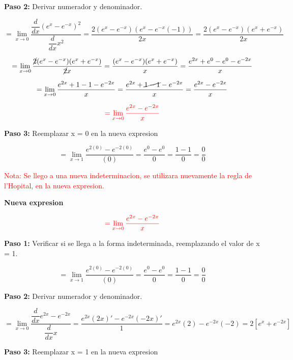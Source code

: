\documentclass[12pt,a4paper]{article}
\begin{document}
\textbf{Paso 2:}
\vspace{0.2cm}
Derivar numerador y denominador.

\[
= \lim_{x \to 0} \frac{\dfrac{d}{dx} (e^{x}- e^{-x})^2}{\dfrac{d}{dx} x^2}= \frac{2(e^{x}- e^{-x})(e^{x}- e^{-x}(-1))}{2x}= \frac{2(e^{x}- e^{-x})(e^{x}+ e^{-x})}{2x}
\]

\[
= \lim_{x \to 0} \frac{\cancel{2}(e^{x}- e^{-x})(e^{x}+ e^{-x})}{\cancel{2}x}= \frac{(e^{x}- e^{-x})(e^{x}+ e^{-x})}{x} = \frac{e^{2x}+ e^{0}-e^{0}-e^{-2x}}{x}
\]

\[
= \lim_{x \to 0} \frac{e^{2x}+ 1-1-e^{-2x}}{x}= \frac{e^{2x}+ \cancel{1-1}-e^{-2x}}{x} = \frac{e^{2x}-e^{-2x}}{x}
\]

\[
\textcolor{red}{= \lim_{x \to 0} \frac{e^{2x}-e^{-2x}}{x}}
\]
\vspace{0.2cm}



\textbf{Paso 3:}
\vspace{0.2cm}
Reemplazar x = 0 en la nueva expresion

\[
= \lim_{x \to 1} \frac{e^{2(0)}-e^{-2(0)}}{(0)}= \frac{e^{0}-e^{0}}{0}= \frac{1-1}{0}= \frac{0}{0}
\]


\newpage

\textcolor{red}{Nota: Se llego a una nueva indeterminacion, se utilizara nuevamente la regla de l'Hopital, en la nueva expresion.}

\vspace{0.2cm}

\textbf{Nueva expresion}

\[
\textcolor{red}{= \lim_{x \to 0} \frac{e^{2x}-e^{-2x}}{x}}
\]


\textbf{Paso 1:}
\vspace{0.2cm}
Verificar si se llega a la forma indeterminada, reemplazando el valor de x = 1.

\[
= \lim_{x \to 1} \frac{e^{2(0)}-e^{-2(0)}}{(0)}= \frac{e^{0}-e^{0}}{0}= \frac{1-1}{0}= \frac{0}{0}
\]

\vspace{0.2cm}

\textbf{Paso 2:}
\vspace{0.2cm}
Derivar numerador y denominador.

\[
= \lim_{x \to 0} \frac{\dfrac{d}{dx} e^{2x}-e^{-2x}}{\dfrac{d}{dx} x}=  \frac{e^{2x}(2x)'-e^{-2x}(-2x)'}{1}= e^{2x}(2)-e^{-2x}(-2)= 2[e^{x}+e^{-2x}]
\]




\textbf{Paso 3:}
\vspace{0.2cm}
Reemplazar x = 1 en la nueva expresion
\end{document}
